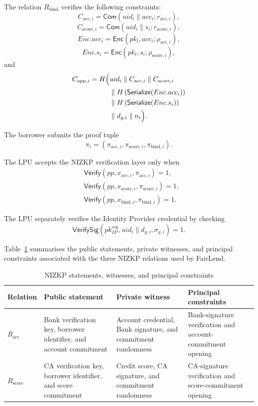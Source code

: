 \documentclass[a4paper,fleqn]{cas-dc}
\begin{document}
{The relation $R_{\mathrm{bind}}$ verifies the following constraints:
\[
C_{\mathrm{acc},i}
=
\mathsf{Com}
\left(
uid_i \parallel acc_i;
r_{\mathrm{acc},i}
\right),
\]
\[
C_{\mathrm{score},i}
=
\mathsf{Com}
\left(
uid_i \parallel s_i;
r_{\mathrm{score},i}
\right),
\]
\[
Enc.acc_i
=
\mathsf{Enc}
\left(
pk_l,
acc_i;
\rho_{\mathrm{acc},i}
\right),
\]
\[
Enc.s_i
=
\mathsf{Enc}
\left(
pk_l,
s_i;
\rho_{\mathrm{score},i}
\right),
\]
and
\[
\begin{aligned}
C_{\mathrm{app},i}
=
H\Bigl(
    &uid_i
    \parallel C_{\mathrm{acc},i}
    \parallel C_{\mathrm{score},i} \\
    &\parallel H\left(\mathsf{Serialize}(Enc.acc_i)\right) \\
    &\parallel H\left(\mathsf{Serialize}(Enc.s_i)\right) \\
    &\parallel d_{g,i}
    \parallel n_i
\Bigr).
\end{aligned}
\]

The borrower submits the proof tuple
\[
\pi_i
=
\left(
\pi_{\mathrm{acc},i},
\pi_{\mathrm{score},i},
\pi_{\mathrm{bind},i}
\right).
\]

The LPU accepts the NIZKP verification layer only when
\[
\begin{aligned}
&
\mathsf{Verify}
\left(
pp,
x_{\mathrm{acc},i},
\pi_{\mathrm{acc},i}
\right)
=1,
\\
&
\mathsf{Verify}
\left(
pp,
x_{\mathrm{score},i},
\pi_{\mathrm{score},i}
\right)
=1,
\\
&
\mathsf{Verify}
\left(
pp,
x_{\mathrm{bind},i},
\pi_{\mathrm{bind},i}
\right)
=1.
\end{aligned}
\]

The LPU separately verifies the Identity Provider credential by checking
\[
\mathsf{VerifySig}
\left(
pk_{IP}^{sig},
uid_i \parallel d_{g,i},
\sigma_{g,i}
\right)
=
1.
\]

Table~\ref{tab:nizkp_constraints} summarises the public statements, private witnesses, and principal constraints associated with the three NIZKP relations used by FairLend.

\begin{table}[htbp] 
\centering 
\caption{NIZKP statements, witnesses, and principal constraints} 
\label{tab:nizkp_constraints} 
\scriptsize 
\begin{tabular}{|p{2.5cm}|p{3.7cm}|p{3.8cm}|p{5.0cm}|} 
\hline 
\textbf{Relation} & \textbf{Public statement} & \textbf{Private witness} & \textbf{Principal constraints} \\ 
\hline 
$R_{\mathrm{acc}}$ & Bank verification key, borrower identifier, and account commitment & Account credential, Bank signature, and commitment randomness & Bank-signature verification and account-commitment opening \\ 
\hline 
$R_{\mathrm{score}}$ & CA verification key, borrower identifier, and score commitment & Credit score, CA signature, and commitment randomness & CA-signature verification and score-commitment opening \\ 
\hline 


\end{tabular}
\end{table}}
\end{document}
